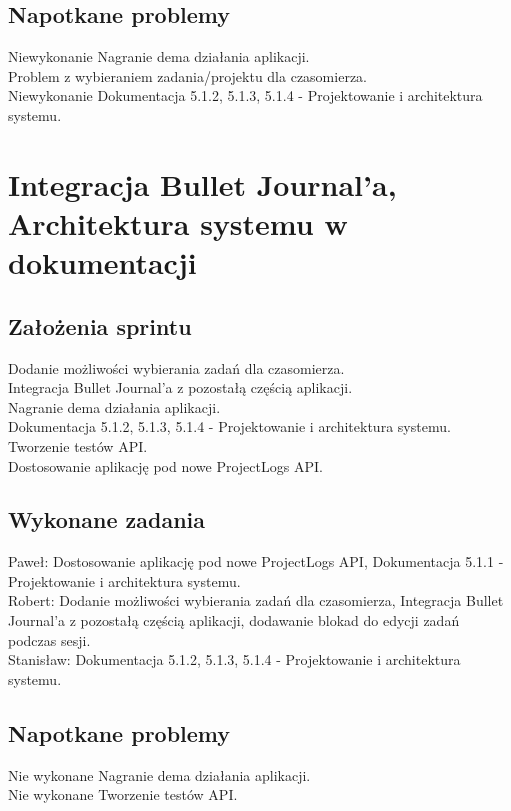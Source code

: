 \documentclass[a4paper,11pt]{report}
\begin{document}
\subsection {Napotkane problemy}
Niewykonanie Nagranie dema działania aplikacji.\\
Problem z wybieraniem zadania/projektu dla czasomierza.\\ 
Niewykonanie Dokumentacja 5.1.2, 5.1.3, 5.1.4 - Projektowanie i architektura systemu.\\


\section {Integracja Bullet Journal’a, Architektura systemu w dokumentacji}
\label{sec:system_zarzadzania_zadaniami_w_dziennikach}
\subsection {Założenia sprintu}
Dodanie możliwości wybierania zadań dla czasomierza.\\
Integracja Bullet Journal’a z pozostałą częścią aplikacji.\\
Nagranie dema działania aplikacji.\\
Dokumentacja 5.1.2, 5.1.3, 5.1.4 - Projektowanie i architektura systemu.\\
Tworzenie testów API.\\
Dostosowanie aplikację pod nowe ProjectLogs API.\\
\subsection {Wykonane zadania}
Paweł: Dostosowanie aplikację pod nowe ProjectLogs API, Dokumentacja 5.1.1 - Projektowanie i architektura systemu.\\
Robert: Dodanie możliwości wybierania zadań dla czasomierza, Integracja Bullet Journal’a z pozostałą częścią aplikacji, dodawanie blokad do edycji zadań podczas sesji. \\
Stanisław: Dokumentacja 5.1.2, 5.1.3, 5.1.4 - Projektowanie i architektura systemu.\\
\subsection {Napotkane problemy}
Nie wykonane Nagranie dema działania aplikacji.\\
Nie wykonane Tworzenie testów API.\\
\end{document}
